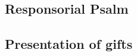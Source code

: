 \documentclass[12pt]{article}
\begin{document}
\begin{center}
\subsection*{Responsorial Psalm}
\end{center}

\begin{center}
\subsection*{Presentation of gifts}
\end{center}
\end{document}
